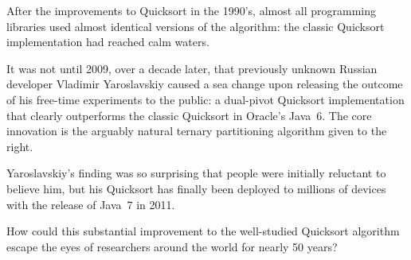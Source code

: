 \documentclass[]{theotage}
\newlength{\originalparindent}
\begin{document}
\noindent
\begin{minipage}{.44\linewidth}
\setlength{\parindent}{\originalparindent}
\strut
After the improvements to Quicksort in the 1990's, 
almost all programming libraries used almost identical versions of the algorithm: 
the classic Quicksort implementation had reached calm waters.

It was not until 2009, over a decade later,
that previously unknown Russian developer Vladimir Yaroslavskiy caused a sea change
upon releasing the outcome of his free-time experiments to the public:
a dual-pivot Quicksort implementation 
that clearly outperforms the classic Quicksort in Oracle's Java~6.
The core innovation is the arguably natural ternary partitioning algorithm
given to the right.

Yaroslavskiy's finding was so surprising that
people were initially reluctant to believe him, but
his Quicksort has finally been deployed to millions of devices
with the release of Java~7 in 2011.




How could this substantial improvement to the well-studied Quicksort algorithm
escape the eyes of researchers around the world for nearly 50 years?


\end{minipage}
\end{document}
